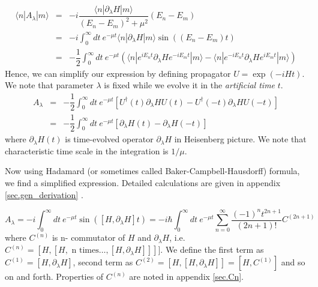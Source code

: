 \documentclass[11pt,a4paper]{article}
\begin{document}
\begin{eqnarray}
\langle n | A_{\lambda} | m \rangle &=&   -i \dfrac{\langle n | \partial_{\lambda}H  | m \rangle}{(E_n-E_m)^2 + \mu^2} (E_n-E_m) \\
&=& -i   \int^{\infty}_{0} dt\ e^{-\mu t} \langle n | \partial_{\lambda}H  | m \rangle \sin((E_n-E_m)t) \\
&=&- \dfrac{ 1}{2}  \int^{\infty}_{0} dt\ e^{-\mu t}  \left(  \langle n | e^{iE_nt} \partial_{\lambda}H   e^{-i E_m t} | m \rangle  -  \langle n |e^{-i E_n t}  \partial_{\lambda}H  e^{ i E_mt} | m \rangle  \right) 
\end{eqnarray}
Hence, we can simplify our expression by defining propagator  $U= \exp(-i H t)$. We note that parameter $\lambda$ is fixed while we evolve it in the \textit{artificial time} $t$.
\begin{eqnarray}
A_{\lambda} &=& -\dfrac{1}{2 }\int_0^{\infty} dt\ e^{-\mu t} [U^{\dagger}(t ) \partial_{\lambda} H U(t ) - U^{\dagger}(-t ) \partial_{\lambda}H U(-t )]  \\
&=& -\dfrac{1}{2 }\int_0^{\infty} dt\ e^{-\mu t} [ \partial_{\lambda} H (t) -  \partial_{\lambda}H (-t )  ]  
\end{eqnarray}
where $\partial_{\lambda}H (t)$ is time-evolved operator $\partial_{\lambda}H$ in Heisenberg picture. We note that characteristic time scale in the integration is $1/\mu$.

Now using  Hadamard (or sometimes called Baker-Campbell-Hausdorff) formula, we find a simplified expression. Detailed calculations are given in appendix \ref{sec.gen_derivation} .

\begin{equation}
A_{\lambda} =  -i\int_0^{\infty} dt\ e^{-\mu t}  \sin ( [H, \partial_{\lambda} H ]t)
= -i\hbar \int_0^{\infty} dt\ e^{-\mu t}  \sum_{n=0}^{\infty}  \dfrac{(-1)^{n} t ^{2n+1}}{(2n+1)!} C^{(2n+1)}
\label{def_1}
\end{equation}
where $C^{(n)}$ is n- commutator of $H$ and $\partial_{\lambda} H$, i.e. $C^{(n)}= [H, [H, \mbox{ n times} \ldots,[H, \partial_{\lambda} H ]]] ] $.  We define the first term as $C^{(1)}= [H, \partial_{\lambda}H]$, second term as $C^{(2)}= [H,[H, \partial_{\lambda}H]]= [H, C^{(1)}]$ and so on and forth. Properties of $C^{(n)}$ are noted in appendix \ref{sec.Cn}.
\end{document}
